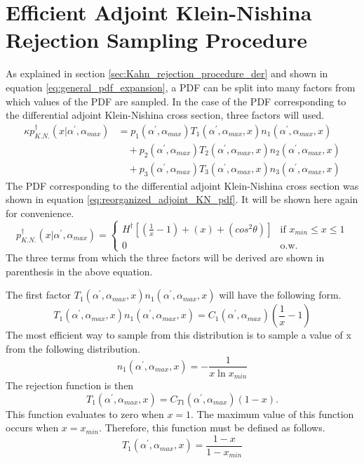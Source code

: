 \section{Efficient Adjoint Klein-Nishina Rejection Sampling Procedure}
As explained in section \ref{sec:Kahn_rejection_procedure_der} and shown in
equation \ref{eq:general_pdf_expansion}, a PDF can be split into many factors 
from which values of the PDF are sampled. In the case of the PDF corresponding 
to the differential adjoint Klein-Nishina cross section, three factors will 
used. 
\begin{align}
  \kappa p_{K.N.}^{\dagger}(x|\alpha^{'},\alpha_{max}) & = 
  p_1(\alpha^{'},\alpha_{max})T_1(\alpha^{'},\alpha_{max},x)
  n_1(\alpha^{'},\alpha_{max},x) \nonumber \\
  & \quad + p_2(\alpha^{'},\alpha_{max})T_2(\alpha^{'},\alpha_{max},x)
  n_2(\alpha^{'},\alpha_{max},x) \nonumber \\
  & \quad + p_3(\alpha^{'},\alpha_{max})T_3(\alpha^{'},\alpha_{max},x)
  n_3(\alpha^{'},\alpha_{max},x) \nonumber 
\end{align}
The PDF corresponding to the differential adjoint Klein-Nishina cross section 
was shown in equation \ref{eq:reorganized_adjoint_KN_pdf}. It will be shown 
here again for convenience.
\begin{equation}
  p_{K.N.}^{\dagger}(x|\alpha^{'},\alpha_{max}) = 
  \begin{cases}
    H^{\dagger}\left[\left(\frac{1}{x} - 1 \right) + \left(x\right) + 
      \left(cos^2\theta\right) \right] 
    & \text{if } x_{min} \leq x \leq 1 \\
    0 & \text{o.w.}
  \end{cases}
\end{equation}
The three terms from which the three factors will be derived are shown in
parenthesis in the above equation. 

The first factor $T_1(\alpha^{'},\alpha_{max},x)n_1(\alpha^{'},\alpha_{max},x)$
will have the following form.
\begin{equation*}
  T_1(\alpha^{'},\alpha_{max},x)n_1(\alpha^{'},\alpha_{max},x) = 
  C_1(\alpha^{'},\alpha_{max})\left(\frac{1}{x}-1\right)
\end{equation*}
The most efficient way to sample from this distribution is to sample a value of
x from the following distribution.
\begin{equation}
  n_1(\alpha^{'},\alpha_{max},x) = -\frac{1}{x\ln{x_{min}}}
\end{equation}
The rejection function is then 
\begin{equation*}
  T_1(\alpha^{'},\alpha_{max},x) = C_{T1}(\alpha^{'},\alpha_{max})(1-x).
\end{equation*}
This function evaluates to zero when $x=1$. The maximum value of this function
occurs when $x=x_{min}$. Therefore, this function must be defined as follows.
\begin{equation}
  T_1(\alpha^{'},\alpha_{max},x) = \frac{1-x}{1-x_{min}}
\end{equation}

